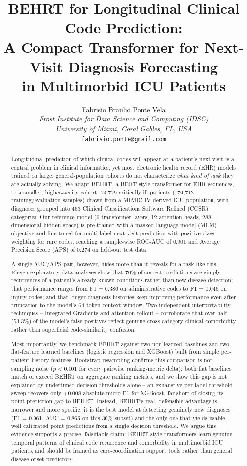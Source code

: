 \documentclass[11pt]{article}
\title{\bfseries BEHRT for Longitudinal Clinical Code Prediction:\\
A Compact Transformer for Next-Visit Diagnosis Forecasting\\
in Multimorbid ICU Patients}
\author{
Fabrisio Braulio Ponte Vela\\
\textit{Frost Institute for Data Science and Computing (IDSC)}\\
\textit{University of Miami, Coral Gables, FL, USA}\\
\texttt{fabrisio.ponte@gmail.com}
}
\date{}
\begin{document}
\maketitle

\begin{abstract}
Longitudinal prediction of which clinical codes will appear at a patient's
next visit is a central problem in clinical informatics, yet most electronic
health record (EHR) models trained on large, general-population cohorts do
not characterize \emph{what kind of task} they are actually solving. We adapt
BEHRT, a BERT-style transformer for EHR sequences, to a smaller,
higher-acuity cohort: 24{,}729 critically ill patients (179{,}713
training/evaluation samples) drawn from a MIMIC-IV-derived ICU population,
with diagnoses grouped into 463 Clinical Classifications Software Refined
(CCSR) categories. Our reference model (6 transformer layers, 12 attention
heads, 288-dimensional hidden space) is pre-trained with a masked language
model (MLM) objective and fine-tuned for multi-label next-visit prediction
with positive-class weighting for rare codes, reaching a sample-wise ROC-AUC
of 0.901 and Average Precision Score (APS) of 0.274 on held-out test data.

A single AUC/APS pair, however, hides more than it reveals for a task like
this. Eleven exploratory data analyses show that 70\% of correct predictions
are simply recurrences of a patient's already-known conditions rather than
new-disease detection; that performance ranges from F1 = 0.386 on
administrative codes to F1 = 0.046 on injury codes; and that longer diagnosis
histories keep improving performance even after truncation to the model's
64-token context window. Two independent interpretability techniques --
Integrated Gradients and attention rollout -- corroborate that over half
(53.3\%) of the model's false positives reflect genuine cross-category
clinical comorbidity rather than superficial code-similarity confusion.

Most importantly, we benchmark BEHRT against two non-learned baselines and
two flat-feature learned baselines (logistic regression and XGBoost) built
from simple per-patient history features. Bootstrap resampling confirms this
comparison is not sampling noise ($p<0.001$ for every pairwise ranking-metric
delta): both flat baselines match or exceed BEHRT on aggregate ranking
metrics, and we show this gap is not explained by undertuned decision
thresholds alone -- an exhaustive per-label threshold sweep recovers only
+0.008 absolute micro-F1 for XGBoost, far short of closing its point-prediction
gap to BEHRT. Instead, BEHRT's real, defensible advantage is narrower and more
specific: it is the best model at detecting genuinely new diagnoses (F1 =
0.061, AUC = 0.865 on this 30\% subset) and the only one that yields usable,
well-calibrated point predictions from a single decision threshold. We argue
this evidence supports a precise, falsifiable claim: BEHRT-style transformers
learn genuine temporal patterns of clinical code recurrence and comorbidity in
multimorbid ICU patients, and should be framed as care-coordination support
tools rather than general disease-onset predictors.
\end{abstract}
\end{document}
